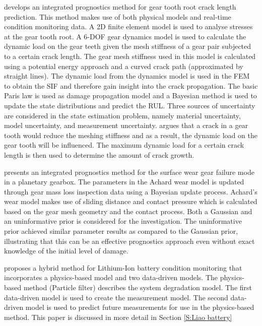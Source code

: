\cite{Zhao2013} develops an integrated prognostics method for gear tooth root crack length prediction. This method makes use of both physical models and real-time condition monitoring data. A 2D finite element model is used to analyse stresses at the gear tooth root. A 6-DOF gear dynamics model is used to calculate the dynamic load on the gear teeth given the mesh stiffness of a gear pair subjected to a certain crack length. The gear mesh stiffness used in this model is calculated using a potential energy approach and a curved crack path (approximated by straight lines). The dynamic load from the dynamics model is used in the FEM to obtain the SIF and therefore gain insight into the crack propagation. The basic Paris law is used as damage propagation model and a Bayesian method is used to update the state distributions and predict the RUL. Three sources of uncertainty are considered in the state estimation problem, namely material uncertainty, model uncertainty, and measurement uncertainty. \cite{Zhao2013} argues that a crack in a gear tooth would reduce the meshing stiffness and as a result, the dynamic load on the gear tooth will be influenced. The maximum dynamic load for a certain crack length is then used to determine the amount of crack growth. 


\cite{Zhao2018a} presents an integrated prognostics method for the surface wear gear failure mode in a planetary gearbox. The parameters in the Achard wear model is updated through gear mass loss inspection data using a Bayesian update process. Achard's wear model makes use of sliding distance and contact pressure which is calculated based on the gear mesh geometry and the contact process. Both a Gaussian and an uninformative prior is considered for the investigation. The uninformative prior achieved similar parameter results as compared to the Gaussian prior, illustrating that this can be an effective prognostics approach even without exact knowledge of the initial level of damage. 




\cite{Liao2016} proposes a hybrid method for Lithium-Ion battery condition monitoring that incorporates a physics-based model and two data-driven models. The physics-based method (Particle filter) describes the system degradation model. The first data-driven model is used to create the measurement model. The second data-driven model is used to predict future measurements for use in the physics-based method. This paper is discussed in more detail in Section \ref{S:Liao battery}


